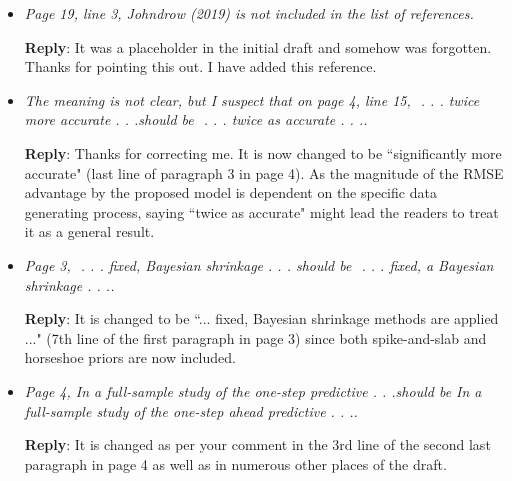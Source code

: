 \documentclass[12pt]{article}
\begin{document}
\begin{itemize}
\item \textit{Page 19, line 3, Johndrow (2019) is not included in the list of references.}

\textbf{Reply}: It was a placeholder in the initial draft and somehow was forgotten. Thanks for pointing this out. I have added this reference.

\item \textit{The meaning is not clear, but I suspect that on page 4, line 15,  . . . twice
more accurate . . .should be  . . . twice as accurate . . ..}

\textbf{Reply}: Thanks for correcting me. It is now changed to be ``significantly more accurate" (last line of paragraph 3 in page 4). As the magnitude of the RMSE advantage by the proposed model is dependent on the specific data generating process, saying ``twice as accurate" might lead the readers to treat it as a general result.

\item \textit{Page 3,  . . . fixed, Bayesian shrinkage . . . should be  . . . fixed, a
Bayesian shrinkage . . ..}

\textbf{Reply}: It is changed to be ``... fixed, Bayesian shrinkage methods are applied ..." (7th line of the first paragraph in page 3) since both spike-and-slab and horseshoe priors are now included. 

\item \textit{Page 4, In a full-sample study of the one-step predictive . . .should be
In a full-sample study of the one-step ahead predictive . . ..}

\textbf{Reply}: It is changed as per your comment in the 3rd line of the second last paragraph in page 4 as well as in numerous other places of the draft.  

\end{itemize}
\end{document}
